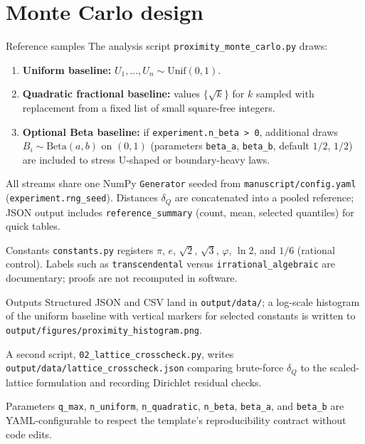 \documentclass[
  ignorenonframetext,
]{beamer}
\author{\texorpdfstring{}{}}
\date{}
\providecommand{\tightlist}{%
  \setlength{\itemsep}{0pt}\setlength{\parskip}{0pt}}
\begin{document}
\section{Monte Carlo design}\label{monte-carlo-design}

\begin{frame}[fragile]{Reference samples}
\protect{}\label{reference-samples}
The analysis script \texttt{proximity\_monte\_carlo.py} draws:

\begin{enumerate}
\tightlist
\item
  \textbf{Uniform baseline:} \(U_1,\ldots,U_n \sim \mathrm{Unif}(0,1)\).
\item
  \textbf{Quadratic fractional baseline:} values \(\{\sqrt{k}\}\) for
  \(k\) sampled with replacement from a fixed list of small square-free
  integers.
\item
  \textbf{Optional Beta baseline:} if
  \texttt{experiment.n\_beta\ \textgreater{}\ 0}, additional draws
  \(B_i \sim \mathrm{Beta}(a,b)\) on \((0,1)\) (parameters
  \texttt{beta\_a}, \texttt{beta\_b}, default \(1/2\), \(1/2\)) are
  included to stress U-shaped or boundary-heavy laws.
\end{enumerate}

All streams share one NumPy \texttt{Generator} seeded from
\texttt{manuscript/config.yaml} (\texttt{experiment.rng\_seed}).
Distances \(\delta_Q\) are concatenated into a pooled reference; JSON
output includes \texttt{reference\_summary} (count, mean, selected
quantiles) for quick tables.
\end{frame}

\begin{frame}[fragile]{Constants}
\protect{}\label{constants}
\texttt{constants.py} registers \(\pi\), \(e\), \(\sqrt{2}\),
\(\sqrt{3}\), \(\varphi\), \(\ln 2\), and \(1/6\) (rational control).
Labels such as \texttt{transcendental} versus
\texttt{irrational\_algebraic} are documentary; proofs are not
recomputed in software.
\end{frame}

\begin{frame}[fragile]{Outputs}
\protect{}\label{outputs}
Structured JSON and CSV land in \texttt{output/data/}; a log-scale
histogram of the uniform baseline with vertical markers for selected
constants is written to
\texttt{output/figures/proximity\_histogram.png}.

A second script, \texttt{02\_lattice\_crosscheck.py}, writes
\texttt{output/data/lattice\_crosscheck.json} comparing brute-force
\(\delta_Q\) to the scaled-lattice formulation and recording Dirichlet
residual checks.

Parameters \texttt{q\_max}, \texttt{n\_uniform}, \texttt{n\_quadratic},
\texttt{n\_beta}, \texttt{beta\_a}, and \texttt{beta\_b} are
YAML-configurable to respect the template's reproducibility contract
without code edits.
\end{frame}
\end{document}
